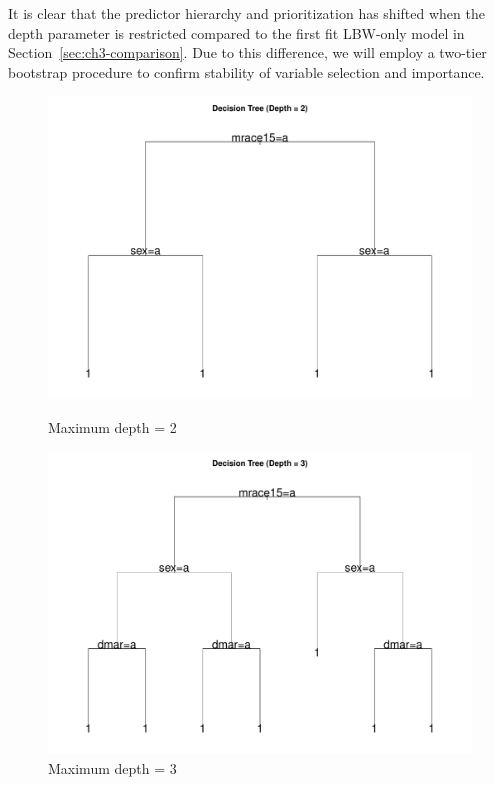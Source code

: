 It is clear that the predictor hierarchy and prioritization has shifted when the depth parameter is restricted compared to the first fit LBW-only model in Section~\ref{sec:ch3-comparison}. Due to this difference, we will employ a two-tier bootstrap procedure to confirm stability of variable selection and importance. 

\begin{figure}[p]
    \centering
    \begin{minipage}{0.48\textwidth}
        \centering
        \includegraphics[width=\linewidth]{chapters/chapter3/figures/depth/plot1/decision_tree_depth_2_2021_large.pdf}
        \caption*{Maximum depth = 2}
    \end{minipage}
    \hspace{0.02\textwidth}
    \begin{minipage}{0.48\textwidth}
        \centering
        \includegraphics[width=\linewidth]{chapters/chapter3/figures/depth/plot1/decision_tree_depth_3_2021_large.pdf}
        \caption*{Maximum depth = 3}
    \end{minipage}
    

\end{figure}
